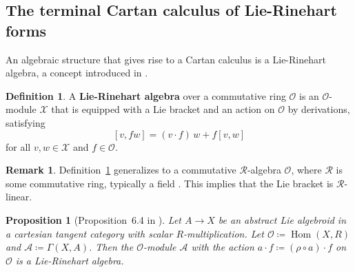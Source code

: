 \documentclass[12pt,reqno, a4paper]{amsart}
\numberwithin{equation}{section}
\theoremstyle{plain}
\newtheorem{Proposition}[Theorem]{Proposition}
\theoremstyle{definition}
\newtheorem{Remark}[Theorem]{Remark}
\newtheorem{Definition}[Theorem]{Definition}
\theoremstyle{remark}
\DeclareMathOperator{\Hom}{Hom}
\newcommand{\calA}{\mathcal{A}}
\newcommand{\calO}{\mathcal{O}}
\newcommand{\calR}{\mathcal{R}}
\newcommand{\calX}{\mathcal{X}}
\begin{document}
\subsection{The terminal Cartan calculus of Lie-Rinehart forms}
\label{sec:LRforms}

An algebraic structure that gives rise to a Cartan calculus is a Lie-Rinehart algebra, a concept introduced in \cite{Rinehart:1963}.

\begin{Definition}
\label{def:LieRinehartAlg}
A \textbf{Lie-Rinehart algebra} over a commutative ring $\calO$ is an $\calO$-module $\calX$ that is equipped with a Lie bracket and an action on $\calO$ by derivations, satisfying
\begin{equation}
\label{eq:LieRineLeibniz}
  [v, fw] = (v \cdot f)\, w + f[v,w]
\end{equation}
for all $v, w \in \calX$ and $f \in \calO$.
\end{Definition}

\begin{Remark}
Definition~\ref{def:LieRinehartAlg} generalizes to a commutative $\calR$-algebra $\calO$, where $\calR$ is some commutative ring, typically a field \cite{Huebschmann:1998}. This implies that the Lie bracket is $\calR$-linear.
\end{Remark}

\begin{Proposition}[Proposition~6.4 in \cite{AintablianBlohmann:2026}]
\label{prop:LieAlgdRinehart}
Let $A \to X$ be an abstract Lie algebroid in a cartesian tangent category with scalar $R$-multiplication. Let $\calO \coloneqq \Hom(X,R)$ and $\calA \coloneqq \Gamma(X,A)$. Then the $\calO$-module $\calA$ with the action $a \cdot f \coloneqq (\rho \circ a) \cdot f$ on $\calO$ is a Lie-Rinehart algebra.
\end{Proposition}
\end{document}
